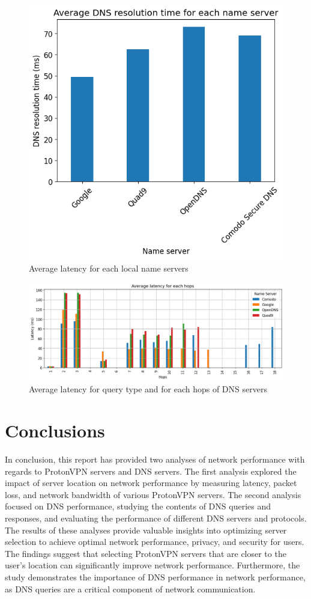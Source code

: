\documentclass[eng]{class}
\begin{document}
\begin{figure}[H]
  \centering
  \includegraphics[width=.7\columnwidth]{images/avgLat2.3.png}
  \caption{Average latency for each local name servers}
  \label{fig-8}
\end{figure}

\begin{figure}[H]
  \centering
  \includegraphics[width=\columnwidth]{images/avglathops2.3.png}
  \caption{Average latency for query type and for each hops of DNS servers}
  \label{fig-9}
\end{figure}
\section{Conclusions}
In conclusion, this report has provided two analyses of network performance with regards to ProtonVPN servers and DNS servers.
The first analysis explored the impact of server location on network performance by measuring latency, packet loss, and network bandwidth of various ProtonVPN servers.
The second analysis focused on DNS performance, studying the contents of DNS queries and responses, and evaluating the performance of different DNS servers and protocols.
The results of these analyses provide valuable insights into optimizing server selection to achieve optimal network performance, privacy, and security for users.
The findings suggest that selecting ProtonVPN servers that are closer to the user's location can significantly improve network performance.
Furthermore, the study demonstrates the importance of DNS performance in network performance, as DNS queries are a critical component of network communication.
\end{document}
